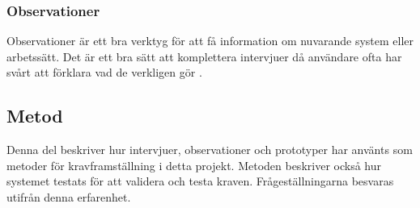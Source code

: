 \subsubsection{Observationer}
Observationer är ett bra verktyg för att få information om nuvarande system eller arbetssätt. Det är ett bra sätt att komplettera intervjuer då användare ofta har svårt att förklara vad de verkligen gör \cite{Lauesen}. 
 
\subsection{Metod}
Denna del beskriver hur intervjuer, observationer och prototyper har använts som metoder för kravframställning i detta projekt. Metoden beskriver också hur systemet testats för att validera och testa kraven. Frågeställningarna besvaras utifrån denna erfarenhet.
